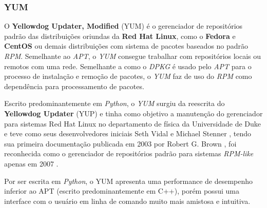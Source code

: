 \subsubsection{YUM} %
\label{ssub:yum}

O \textbf{Yellowdog Updater, Modified} (YUM) é o gerenciador de repositórios padrão  das distribuições oriundas da \textbf{Red Hat Linux}, como o \textbf{Fedora} e \textbf{CentOS} ou demais distribuições com sistema de pacotes baseados no padrão \textit{RPM}. Semelhante ao \textit{APT}, o \textit{YUM} consegue trabalhar com repositórios locais ou remotos com uma rede.
Semelhante a como o \textit{DPKG} é usado pelo \textit{APT} para o processo de instalação e remoção de pacotes, o \textit{YUM} faz de uso do 	\textit{RPM} como dependência para processamento de pacotes.

Escrito predominantemente em \textit{Python}, o \textit{YUM} surgiu  da reescrita do \textbf{Yellowdog Updater} (YUP) e tinha como objetivo a manutenção do gerenciador para sistemas Red Hat Linux no departamento de física da Universidade de Duke e teve como seus desenvolvedores iniciais Seth Vidal e Michael Stenner \cite{yum-howto}, tendo sua primeira documentação publicada em 2003 por Robert G. Brown \cite{yum_article}, foi reconhecida como o gerenciador de repositórios padrão para sistemas \textit{RPM-like} apenas em 2007 \cite{fusco2007linux}.

Por ser escrita em \textit{Python}, o YUM apresenta uma performance de desempenho inferior ao APT (escrito predominantemente em C++), porém possui uma interface com o usuário em linha de comando muito mais amistosa e intuitiva.